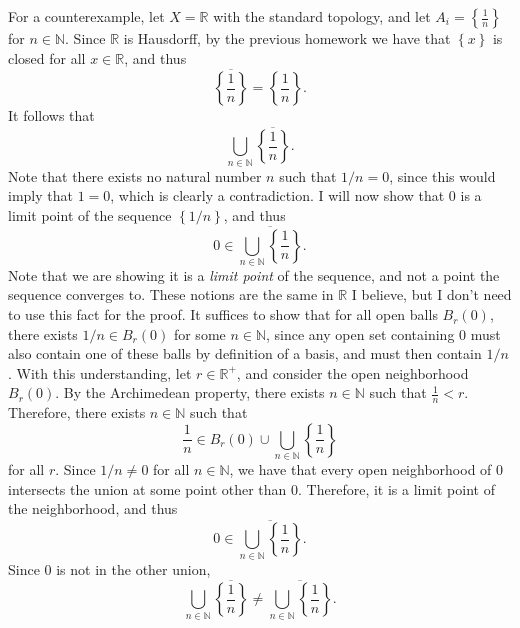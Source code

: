 \documentclass[11pt, letterpaper]{article}
\begin{document}
For a counterexample, let $X=\mathbb{R} $ with the standard topology, and let $A_i=\left\{ \frac{1}{n}  \right\} $ for $n\in\mathbb{N} $. Since $\mathbb{R} $ is Hausdorff, by the previous homework we have that $\left\{ x \right\} $ is closed for all $x\in \mathbb{R} $, and thus
\[
	\overline{\left\{ \frac{1}{n}  \right\} } =\left\{ \frac{1}{n}  \right\} 
.\]
It follows that
\[
	\bigcup_{n\in\mathbb{N} } \overline{\left\{ \frac{1}{n}  \right\} } 
.\]
Note that there exists no natural number $n$ such that $1/n=0$, since this would imply that $1=0$, which is clearly a contradiction. I will now show that $0$ is a limit point of the sequence $\left\{ 1/n \right\} $, and thus
\[
	0\in \overline{\bigcup_{n\in\mathbb{N} }\left\{ \frac{1}{n}  \right\}  } 
.\]
Note that we are showing it is a \emph{limit point} of the sequence, and not a point the sequence converges to. These notions are the same in $\mathbb{R} $ I believe, but I don't need to use this fact for the proof. It suffices to show that for all open balls $B_r(0)$, there exists $1/n\in B_r(0)$ for some $n\in\mathbb{N} $, since any open set containing $0$ must also contain one of these balls by definition of a basis, and must then contain $1/n$. With this understanding, let $r\in\mathbb{R} ^+$, and consider the open neighborhood $B_r(0)$. By the Archimedean property, there exists $n\in\mathbb{N} $ such that $\frac{1}{n} <r$. Therefore, there exists $n\in\mathbb{N} $ such that
\[
	\frac{1}{n} \in B_r(0) \cup \bigcup_{n\in\mathbb{N} } \left\{ \frac{1}{n}  \right\} 
\]
for all $r$. Since $1/n \neq 0$ for all $n\in\mathbb{N} $, we have that every open neighborhood of $0$ intersects the union at some point other than $0$. Therefore, it is a limit point of the neighborhood, and thus
\[
	0\in \overline{\bigcup_{n\in\mathbb{N} } \left\{ \frac{1}{n}  \right\} } 
.\]
Since $0$ is not in the other union,
\[
	\bigcup_{n\in\mathbb{N} } \overline{\left\{ \frac{1}{n}  \right\} } \neq \overline{\bigcup_{n\in\mathbb{N} } \left\{ \frac{1}{n}  \right\} } 
.\]
\end{document}
